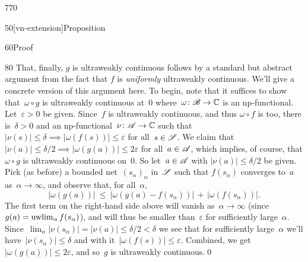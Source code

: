 \begin{parsec}{770}
\begin{point}{50}[vn-extension]{Proposition}
\begin{point}{60}{Proof}
\begin{point}{80}
That, finally, $g$ is ultraweakly continuous
follows by a standard but abstract argument from the fact
that $f$ is \emph{uniformly} ultraweakly continuous.
We'll give a concrete version of this argument here.
To begin, note that it suffices to show that~$\omega\circ g$
is ultraweakly continuous
at~$0$
where~$\omega\colon \mathscr{B}\to\mathbb{C}$
is an np-functional.
Let~$\varepsilon>0$ be given.
Since~$f$ 
is ultraweakly continuous,
and 
thus $\omega\circ f$ is too,
there is~$\delta>0$ and an np-functional~$\nu\colon \mathscr{A}\to\mathbb{C}$
such that $\left|\nu(s)\right|\leq \delta \implies 
\left|\omega(f(s))\right|\leq \varepsilon$
for all~$s\in\mathscr{S}$.
We claim that $\left|\nu(a)\right|\leq \delta/2 \implies
\left|\omega(g(a))\right|\leq 2\varepsilon$
for all~$a\in\mathscr{A}$,
which implies, of course,
that $\omega\circ g$ is ultraweakly continuous on~$0$.
So let~$a\in\mathscr{A}$ with $\left|\nu(a)\right|\leq \delta/2$
be given.
Pick (as before) a bounded net~$(s_\alpha)_\alpha$
in~$\mathscr{S}$
such that $f(s_\alpha)$
converges to~$a$ as~$\alpha\to\infty$, and observe that,
for all~$\alpha$,
\begin{equation*}
\left|\omega(g (a))\right|
\ \leq\ 
\left|\omega(g(a)-f(s_\alpha))\right|
\,+\,\left|\omega(f(s_\alpha))\right|.
\end{equation*}
The first term on the right-hand side above will 
vanish as~$\alpha\to\infty$ (since 
$g (a)=\uwlim_\alpha f (s_\alpha)$),
and will thus be smaller than~$\varepsilon$ 
for sufficiently large~$\alpha$.
Since~$\lim_\alpha \left|\nu(s_\alpha)\right|=\left|\nu(a)\right|
\leq \delta/2<\delta$
we see 
that for sufficiently large~$\alpha$
we'll have~$\left|\nu(s_\alpha)\right|\leq \delta$ 
and with it~$\left|\omega(f (s))\right|\leq \varepsilon$.
Combined,
we get $\left|\omega(g (a))\right|\leq 2\varepsilon$,
and so~$g$ is ultraweakly continuous.\qed
\end{point}

\end{point}
\end{point}
\end{parsec}

